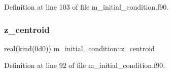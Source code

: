Definition at line 103 of file m\+\_\+initial\+\_\+condition.\+f90.

\mbox{\label{namespacem__initial__condition_aca427fa4af7501277f10bf96977a9766}} 
\subsubsection{\texorpdfstring{z\+\_\+centroid}{z\_centroid}}
{\footnotesize\ttfamily real(kind(0d0)) m\+\_\+initial\+\_\+condition\+::z\+\_\+centroid}



Definition at line 92 of file m\+\_\+initial\+\_\+condition.\+f90.

